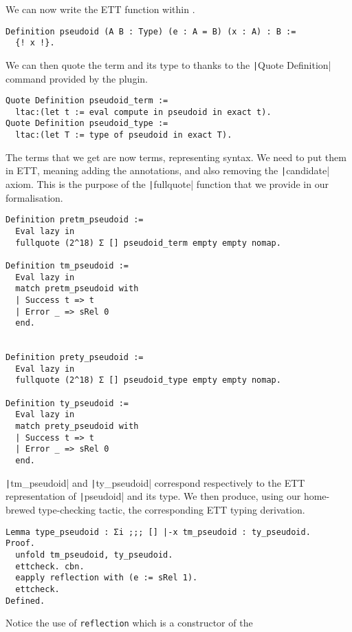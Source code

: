 We can now write the \acrshort{ETT} function within \Coq.
%
\begin{verbatim}
Definition pseudoid (A B : Type) (e : A = B) (x : A) : B :=
  {! x !}.
\end{verbatim}
%
We can then quote the term and its type to \MetaCoq thanks to the
\texttt|Quote Definition| command provided by the plugin.
%
\begin{verbatim}
Quote Definition pseudoid_term :=
  ltac:(let t := eval compute in pseudoid in exact t).
Quote Definition pseudoid_type :=
  ltac:(let T := type of pseudoid in exact T).
\end{verbatim}
%
The terms that we get are now \MetaCoq terms, representing \Coq syntax.
We need to put them in \acrshort{ETT}, meaning adding the annotations, and also
removing the \texttt|candidate| axiom.
This is the purpose of the \texttt|fullquote| function that we provide
in our formalisation.
%
\begin{verbatim}
Definition pretm_pseudoid :=
  Eval lazy in
  fullquote (2^18) Σ [] pseudoid_term empty empty nomap.

Definition tm_pseudoid :=
  Eval lazy in
  match pretm_pseudoid with
  | Success t => t
  | Error _ => sRel 0
  end.


Definition prety_pseudoid :=
  Eval lazy in
  fullquote (2^18) Σ [] pseudoid_type empty empty nomap.

Definition ty_pseudoid :=
  Eval lazy in
  match prety_pseudoid with
  | Success t => t
  | Error _ => sRel 0
  end.
\end{verbatim}
%
\texttt|tm_pseudoid| and \texttt|ty_pseudoid| correspond
respectively to the \acrshort{ETT} representation of \texttt|pseudoid|
and its type.
We then produce, using our home-brewed \ltac type-checking tactic, the
corresponding \acrshort{ETT} typing derivation.
%
\begin{verbatim}
Lemma type_pseudoid : Σi ;;; [] |-x tm_pseudoid : ty_pseudoid.
Proof.
  unfold tm_pseudoid, ty_pseudoid.
  ettcheck. cbn.
  eapply reflection with (e := sRel 1).
  ettcheck.
Defined.
\end{verbatim}
%
Notice the use of \texttt{reflection} which is a constructor of the

